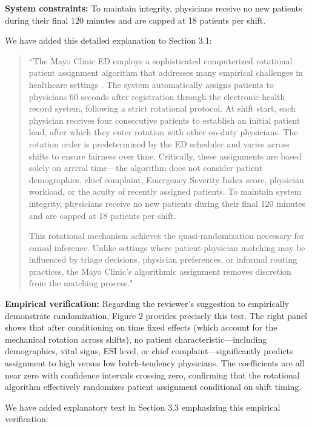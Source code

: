 \documentclass[11pt]{article}
\newcommand{\1}{\hbox{\rm 1\kern-.35em 1}}
\begin{document}
{\textbf{System constraints:} To maintain integrity, physicians receive no new patients during their final 120 minutes and are capped at 18 patients per shift.

We have added this detailed explanation to Section 3.1:

\begin{quote}
``The Mayo Clinic ED employs a sophisticated computerized rotational patient assignment algorithm that addresses many empirical challenges in healthcare settings \cite{Traub2016, traub2016emergency, Traub2018}. The system automatically assigns patients to physicians 60 seconds after registration through the electronic health record system, following a strict rotational protocol. At shift start, each physician receives four consecutive patients to establish an initial patient load, after which they enter rotation with other on-duty physicians. The rotation order is predetermined by the ED scheduler and varies across shifts to ensure fairness over time. Critically, these assignments are based solely on arrival time—the algorithm does not consider patient demographics, chief complaint, Emergency Severity Index score, physician workload, or the acuity of recently assigned patients. To maintain system integrity, physicians receive no new patients during their final 120 minutes and are capped at 18 patients per shift.

This rotational mechanism achieves the quasi-randomization necessary for causal inference. Unlike settings where patient-physician matching may be influenced by triage decisions, physician preferences, or informal routing practices, the Mayo Clinic's algorithmic assignment removes discretion from the matching process."
\end{quote}

\textbf{Empirical verification:} Regarding the reviewer's suggestion to empirically demonstrate randomization, Figure 2 provides precisely this test. The right panel shows that after conditioning on time fixed effects (which account for the mechanical rotation across shifts), no patient characteristic—including demographics, vital signs, ESI level, or chief complaint—significantly predicts assignment to high versus low batch-tendency physicians. The coefficients are all near zero with confidence intervals crossing zero, confirming that the rotational algorithm effectively randomizes patient assignment conditional on shift timing.

We have added explanatory text in Section 3.3 emphasizing this empirical verification:

}
\end{document}
